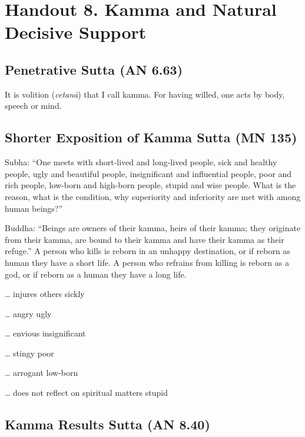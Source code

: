 \documentclass[a4 paper, 12pt]{article}
\begin{document}
\pagestyle{empty}

\section*{Handout 8. Kamma and Natural Decisive Support}

\subsection*{Penetrative Sutta (AN 6.63)}

It is volition (\textit{cetanā}) that I call kamma. For having willed, one acts by body, speech or mind.

\subsection*{Shorter Exposition of Kamma Sutta (MN 135)}

Subha: “One meets with short-lived and long-lived people, sick and healthy people, ugly and beautiful people, insignificant and influential people, poor and rich people, low-born and high-born people, stupid and wise people. What is the reason, what is the condition, why superiority and inferiority are met with among human beings?”

Buddha: “Beings are owners of their kamma, heirs of their kamma; they originate from their kamma, are bound to their kamma and have their kamma as their refuge.”
A person who kills is reborn in an unhappy destination, or if reborn as human they have a short life. A person who refrains from killing is reborn as a god, or if reborn as a human they have a long life.

… injures others \textrightarrow \hspace{1mm} sickly

… angry \textrightarrow \hspace{1mm} ugly

… envious \textrightarrow \hspace{1mm} insignificant

… stingy \textrightarrow \hspace{1mm} poor

… arrogant \textrightarrow \hspace{1mm} low-born

… does not reflect on spiritual matters \textrightarrow \hspace{1mm} stupid

\subsection*{Kamma Results Sutta (AN 8.40)}
\end{document}
